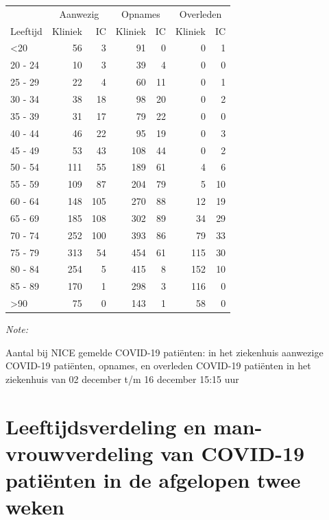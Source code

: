 \documentclass[
  english,
  man,floatsintext]{apa6}
\begin{document}
\begin{table}
\centering\begingroup\fontsize{10}{12}\selectfont

\begin{threeparttable}
\begin{tabular}{lrrrrrr}
\toprule
\multicolumn{1}{c}{ } & \multicolumn{2}{c}{Aanwezig} & \multicolumn{2}{c}{Opnames} & \multicolumn{2}{c}{Overleden} \\
\cmidrule(l{3pt}r{3pt}){2-3} \cmidrule(l{3pt}r{3pt}){4-5} \cmidrule(l{3pt}r{3pt}){6-7}
Leeftijd & Kliniek & IC & Kliniek & IC & Kliniek & IC\\
\midrule
<20 & 56 & 3 & 91 & 0 & 0 & 1\\
20 - 24 & 10 & 3 & 39 & 4 & 0 & 0\\
25 - 29 & 22 & 4 & 60 & 11 & 0 & 1\\
30 - 34 & 38 & 18 & 98 & 20 & 0 & 2\\
35 - 39 & 31 & 17 & 79 & 22 & 0 & 0\\
40 - 44 & 46 & 22 & 95 & 19 & 0 & 3\\
45 - 49 & 53 & 43 & 108 & 44 & 0 & 2\\
50 - 54 & 111 & 55 & 189 & 61 & 4 & 6\\
55 - 59 & 109 & 87 & 204 & 79 & 5 & 10\\
60 - 64 & 148 & 105 & 270 & 88 & 12 & 19\\
65 - 69 & 185 & 108 & 302 & 89 & 34 & 29\\
70 - 74 & 252 & 100 & 393 & 86 & 79 & 33\\
75 - 79 & 313 & 54 & 454 & 61 & 115 & 30\\
80 - 84 & 254 & 5 & 415 & 8 & 152 & 10\\
85 - 89 & 170 & 1 & 298 & 3 & 116 & 0\\
>90 & 75 & 0 & 143 & 1 & 58 & 0\\
\bottomrule
\end{tabular}
\begin{tablenotes}
\item \textit{Note: } 
\item Aantal bij NICE gemelde COVID-19 patiënten: in het ziekenhuis aanwezige COVID-19 patiënten, opnames, en overleden COVID-19 patiënten in het ziekenhuis van 02 december t/m 16 december 15:15 uur
\end{tablenotes}
\end{threeparttable}
\endgroup{}
\end{table}

\newpage

\hypertarget{leeftijdsverdeling-en-man-vrouwverdeling-van-covid-19-patiuxebnten-in-de-afgelopen-twee-weken}{%
\section{Leeftijdsverdeling en man-vrouwverdeling van COVID-19 patiënten in de afgelopen twee weken}\label{leeftijdsverdeling-en-man-vrouwverdeling-van-covid-19-patiuxebnten-in-de-afgelopen-twee-weken}}
\end{document}

